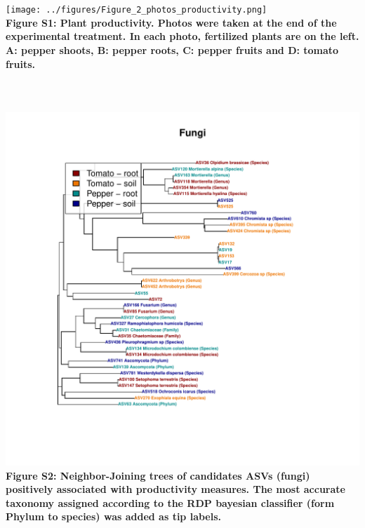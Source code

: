 \documentclass[11pt,]{article}
\begin{document}
~\\
\hspace*{0.333em}\\
\hspace*{0.333em}
\texttt{[image: ../figures/Figure\_2\_photos\_productivity.png]}\\
\textbf{Figure S1: Plant productivity. Photos were taken at the end of
the experimental treatment. In each photo, fertilized plants are on the
left. A: pepper shoots, B: pepper roots, C: pepper fruits and D: tomato
fruits.}\\
\hspace*{0.333em}\\
\hspace*{0.333em}\\
\hspace*{0.333em}\\
\includegraphics{../figures/fungi/Figure7_fungi_tree.pdf}\\
\textbf{Figure S2: Neighbor-Joining trees of candidates ASVs (fungi)
positively associated with productivity measures. The most accurate
taxonomy assigned according to the RDP bayesian classifier (form Phylum
to species) was added as tip labels.} ~\\
\hspace*{0.333em}\\
\hspace*{0.333em}\\
\end{document}
